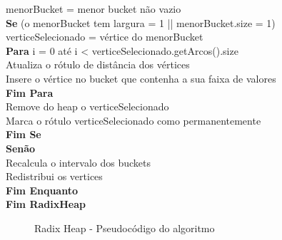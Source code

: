 {\begin{minipage}{70ex}
\vspace*{-1mm} \phantom{} \hspace{6ex} menorBucket = menor bucket não vazio\\
\vspace*{-1mm} \phantom{} \hspace{6ex} {\bf Se} (o menorBucket tem largura = 1 || menorBucket.size = 1)\\
\vspace*{-1mm} \phantom{} \hspace{9ex} verticeSelecionado = vértice do menorBucket\\
\vspace*{-1mm} \phantom{} \hspace{9ex} {\bf Para} i = 0 até i < verticeSelecionado.getArcos().size\\
\vspace*{-1mm} \phantom{} \hspace{12ex} Atualiza o rótulo de distância dos vértices\\
\vspace*{-1mm} \phantom{} \hspace{12ex} Insere o vértice no bucket que contenha a sua faixa de valores\\
\vspace*{-1mm} \phantom{} \hspace{9ex} {\bf Fim Para}\\
\vspace*{-1mm} \phantom{} \hspace{9ex} Remove do heap o verticeSelecionado\\
\vspace*{-1mm} \phantom{} \hspace{9ex} Marca o rótulo verticeSelecionado como permanentemente\\
\vspace*{-1mm} \phantom{} \hspace{6ex} {\bf Fim Se}\\
\vspace*{-1mm} \phantom{} \hspace{6ex} {\bf Senão}\\
\vspace*{-1mm} \phantom{} \hspace{9ex} Recalcula o intervalo dos buckets\\
\vspace*{-1mm} \phantom{} \hspace{9ex} Redistribui os vertices\\
\vspace*{-1mm} \phantom{} \hspace{3ex} {\bf Fim Enquanto}\\
\vspace*{-1mm} \phantom{} \hspace{0ex} {\bf Fim RadixHeap}\\
\end{minipage}}
\begin{figure}[htbp]
\centering
\caption{Radix Heap - Pseudocódigo do algoritmo}
\label{fig:codeRadix}
\end{figure}
\FloatBarrier

